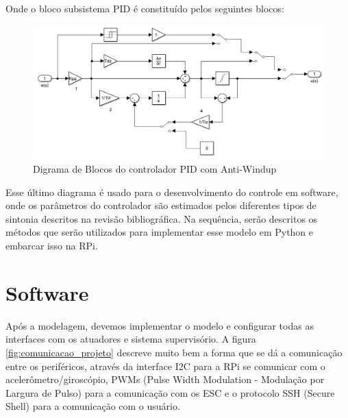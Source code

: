 Onde o bloco subsistema PID é constituído pelos seguintes blocos:

\begin{figure}[H]
  \caption{Digrama de Blocos do controlador PID com Anti-Windup}
  \begin{center}
      \includegraphics[scale=.45]{metodologia/img/matlab_pid_antiwindup}
  \end{center}
  \label{fig:simulink_modelo_completo_aberto}
\end{figure}

Esse último diagrama é usado para o desenvolvimento do controle em software, onde os parâmetros do controlador são estimados pelos diferentes tipos de sintonia descritos na revisão bibliográfica. Na sequência, serão descritos os métodos que serão utilizados para implementar esse modelo em Python e embarcar isso na RPi.



\section{Software}

Após a modelagem, devemos implementar o modelo e configurar todas as interfaces com os atuadores e sistema supervisório. A figura \ref{fig:comunicacao_projeto} descreve muito bem a forma que se dá a comunicação entre os periféricos, através da interface I2C para a RPi se comunicar com o acelerômetro/giroscópio, PWMs (Pulse Width Modulation - Modulação por Largura de Pulso) para a comunicação com os ESC e o protocolo SSH (Secure Shell) para a comunicação com o usuário.

